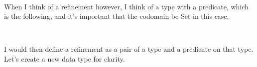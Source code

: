 \documentclass{article}
\begin{document}
\begin{code}%
\>[0]\AgdaSpace{}%
\AgdaSymbol{:}\AgdaSpace{}%
\AgdaSymbol{\{}\AgdaSpace{}%
\AgdaSpace{}%
\AgdaSymbol{:}\AgdaSpace{}%
\AgdaSymbol{\}}\AgdaSpace{}%
\AgdaSpace{}%
\AgdaSpace{}%
\AgdaSpace{}%
\AgdaSpace{}%
\AgdaSpace{}%
\AgdaSpace{}%
\AgdaSpace{}%
\AgdaSymbol{(}\AgdaSpace{}%
\AgdaSymbol{:}\AgdaSpace{}%
\AgdaSymbol{)}\AgdaSpace{}%
\AgdaSpace{}%
\AgdaSpace{}%
\AgdaSymbol{(}\AgdaSpace{}%
\AgdaSpace{}%
\AgdaSpace{}%
\AgdaSpace{}%
\AgdaSpace{}%
\AgdaSymbol{)}\<%
\\
\>[0]\AgdaSpace{}%
\AgdaSpace{}%
\AgdaSpace{}%
\AgdaSpace{}%
\AgdaSymbol{=}\AgdaSpace{}%
\AgdaSpace{}%
\AgdaSpace{}%
\AgdaSpace{}%
\AgdaSpace{}%
\AgdaSpace{}%
\<%
\end{code}

When I think of a refinement however, I think of a type with a
predicate, which is the following, and it's important that the
codomain be Set in this case.

\begin{code}%
\>[0]\AgdaSpace{}%
\AgdaSymbol{:}\AgdaSpace{}%
\AgdaSymbol{\{}\AgdaSpace{}%
\AgdaSymbol{:}\AgdaSpace{}%
\AgdaSymbol{\}}\AgdaSpace{}%
\AgdaSpace{}%
\AgdaSpace{}%
\AgdaSpace{}%
\AgdaSpace{}%
\AgdaSymbol{(}\AgdaSpace{}%
\AgdaSymbol{:}\AgdaSpace{}%
\AgdaSymbol{)}\AgdaSpace{}%
\AgdaSpace{}%
\AgdaSpace{}%
\AgdaSymbol{(}\AgdaSpace{}%
\AgdaSpace{}%
\AgdaSpace{}%
\AgdaSymbol{)}\<%
\\
\>[0]\AgdaSpace{}%
\AgdaSpace{}%
\AgdaSpace{}%
\AgdaSymbol{=}\AgdaSpace{}%
\AgdaSpace{}%
\AgdaSpace{}%
\AgdaSpace{}%
\<%
\end{code}

I would then define a refinement as a pair of a type and a
predicate on that type. Let's create a new data type for clarity.
\end{document}
